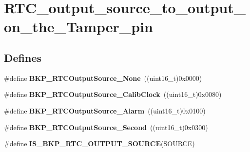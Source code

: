 \hypertarget{group__RTC__output__source__to__output__on__the__Tamper__pin}{
\section{RTC\_\-output\_\-source\_\-to\_\-output\_\-on\_\-the\_\-Tamper\_\-pin}
\label{group__RTC__output__source__to__output__on__the__Tamper__pin}
}
\subsection*{Defines}
\begin{DoxyCompactItemize}
\item 
\hypertarget{group__RTC__output__source__to__output__on__the__Tamper__pin_ga8a18950396b2db70311480ab76464c6e}{
\#define {\bfseries BKP\_\-RTCOutputSource\_\-None}~((uint16\_\-t)0x0000)}
\label{group__RTC__output__source__to__output__on__the__Tamper__pin_ga8a18950396b2db70311480ab76464c6e}

\item 
\hypertarget{group__RTC__output__source__to__output__on__the__Tamper__pin_ga6fd7cb80bb52bca65641cbe6aa2c4590}{
\#define {\bfseries BKP\_\-RTCOutputSource\_\-CalibClock}~((uint16\_\-t)0x0080)}
\label{group__RTC__output__source__to__output__on__the__Tamper__pin_ga6fd7cb80bb52bca65641cbe6aa2c4590}

\item 
\hypertarget{group__RTC__output__source__to__output__on__the__Tamper__pin_gac016224386421d0cb1c0cd0ee201d65a}{
\#define {\bfseries BKP\_\-RTCOutputSource\_\-Alarm}~((uint16\_\-t)0x0100)}
\label{group__RTC__output__source__to__output__on__the__Tamper__pin_gac016224386421d0cb1c0cd0ee201d65a}

\item 
\hypertarget{group__RTC__output__source__to__output__on__the__Tamper__pin_ga23cb72635820331317ee4ee5a7897a70}{
\#define {\bfseries BKP\_\-RTCOutputSource\_\-Second}~((uint16\_\-t)0x0300)}
\label{group__RTC__output__source__to__output__on__the__Tamper__pin_ga23cb72635820331317ee4ee5a7897a70}

\item 
\#define {\bfseries IS\_\-BKP\_\-RTC\_\-OUTPUT\_\-SOURCE}(SOURCE)
\end{DoxyCompactItemize}


